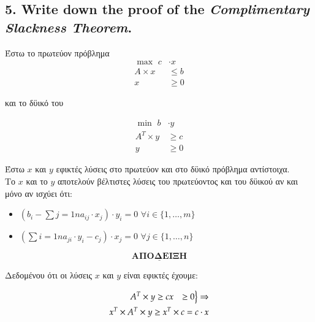 \documentclass[12pt]{article}
\newcommand{\margin}{\hspace{4pt}}
\newenvironment{rcases}
	{\left.\begin{aligned}}
	{\end{aligned}\right\rbrace}
\begin{document}
\vspace{2in}

\pagebreak

\subsection*{5. Write down the proof of the \textit{Complimentary Slackness Theorem}.}

Έστω το πρωτεύον πρόβλημα \\

\begin{align*}
    \max \margin c & \cdot x \\
    A \times x & \leq b \\
    x & \geq 0
\end{align*}

και το δϋικό του

\begin{align*}
    \min \margin b & \cdot y \\
    A^T \times y & \geq c \\
    y & \geq 0
\end{align*}

Έστω \( x \) και \( y \) εφικτές λύσεις στο πρωτεύον και στο δϋικό πρόβλημα αντίστοιχα. \\

Το \( x \) και το \( y \) αποτελούν βέλτιστες λύσεις του πρωτεύοντος και του δϋικού
αν και μόνο αν ισχύει ότι: \\

\begin{itemize}
    \item \( (b_i - \sum{j = 1}{n} a_{ij} \cdot x_j) \cdot y_i = 0 \margin \forall i \in \{ 1, \ldots, m\} \)
    \item \( (\sum{i = 1}{n} a_{ji} \cdot y_i - c_j) \cdot x_j = 0 \margin \forall j \in \{ 1, \ldots, n\} \)
\end{itemize}

\[ \underline{\textbf{ΑΠΟΔΕΙΞΗ}} \]

Δεδομένου ότι οι λύσεις \( x \) και \( y \) είναι εφικτές έχουμε:

\begin{align*}
    \begin{rcases}
        A^T & \times y \geq c
        x & \geq 0
    \end{rcases}
    \Rightarrow \\
    x^T \times A^T \times y \geq x^T \times c = c \cdot x
\end{align*}
\end{document}
